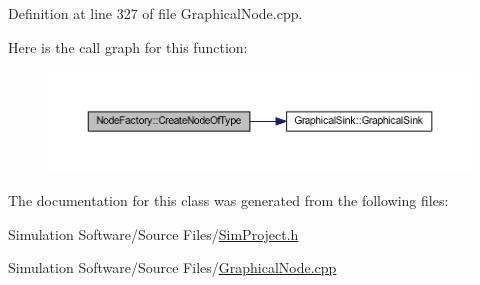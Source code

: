 Definition at line 327 of file Graphical\+Node.\+cpp.

Here is the call graph for this function\+:
\nopagebreak
\begin{figure}[H]
\begin{center}
\leavevmode
\includegraphics[width=350pt]{class_node_factory_a152f41696a5206529e5c2981fefcdf55_cgraph}
\end{center}
\end{figure}


The documentation for this class was generated from the following files\+:\begin{DoxyCompactItemize}
\item 
Simulation Software/\+Source Files/\hyperlink{_sim_project_8h}{Sim\+Project.\+h}\item 
Simulation Software/\+Source Files/\hyperlink{_graphical_node_8cpp}{Graphical\+Node.\+cpp}\end{DoxyCompactItemize}

